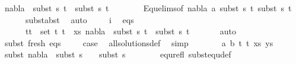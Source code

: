 \begin{isabellebody}
\ {\isachardoublequoteopen}nabla{}\ {\isasymturnstile}\ subst\ s{}\ t{}\ {\isasymapprox}\ subst\ s{}\ t{}{\isachardoublequoteclose}\ \isanewline
\ \ \ \ \ \isamarkupfalse%
\ Equ{\isacharunderscore}{\kern0pt}elims{\isacharparenleft}{\kern0pt}{}{\isacharparenright}{\kern0pt}{\isacharbrackleft}{\kern0pt}of\ nabla{}\ a\ {\isacartoucheopen}subst\ s{}\ t{}{\isacartoucheclose}\ {\isacartoucheopen}subst\ s{}\ t{}{\isacartoucheclose}{\isacharbrackright}{\kern0pt}\ \isanewline
\ \ \ \ \ \ subst{\isacharunderscore}{\kern0pt}abst\ \isamarkupfalse%
\ auto\isanewline
\ \ \ \isamarkupfalse%
\ i\ \isamarkupfalse%
\ eqs{\isacharcolon}{\kern0pt}\ \isanewline
\ \ \ \ \ {\isachardoublequoteopen}{\isasymforall}\ {\isacharparenleft}{\kern0pt}t{}{\isacharcomma}{\kern0pt}t{}{\isacharparenright}{\kern0pt}\ {\isasymin}\ set\ {\isacharparenleft}{\kern0pt}{\isacharparenleft}{\kern0pt}t{}{\isacharcomma}{\kern0pt}\ t{}{\isacharparenright}{\kern0pt}\ {\isacharhash}{\kern0pt}\ xs{\isacharparenright}{\kern0pt}{\isachardot}{\kern0pt}\ nabla{}\ {\isasymturnstile}\ subst\ s{}\ t{}\ {\isasymapprox}\ subst\ s{}\ t{}{\isachardoublequoteclose}\isanewline
\ \ \ \ \ \isamarkupfalse%
\ auto\isanewline
\isanewline
\ \ \ \isamarkupfalse%
\ subst\ fresh\ eqs\isanewline
\ \ \ \isamarkupfalse%
\ {\isacharquery}{\kern0pt}case\ \isamarkupfalse%
\ all{\isacharunderscore}{\kern0pt}solutions{\isacharunderscore}{\kern0pt}def\ \isamarkupfalse%
\ simp\isanewline
\ \isamarkupfalse%
\isanewline
\ \ \ \isamarkupfalse%
\ {\isacharparenleft}{\kern0pt}{}\ a\ b\ t{}\ t{}\ xs\ ys{\isacharparenright}{\kern0pt}\isanewline
\ \ \ \isamarkupfalse%
\ \isamarkupfalse%
\ subst{\isacharcolon}{\kern0pt}\ {\isachardoublequoteopen}nabla{}\ {\isasymTurnstile}\ subst\ {\isacharparenleft}{\kern0pt}s{}\ {\isasymbullet}\ {\isacharbrackleft}{\kern0pt}{\isacharbrackright}{\kern0pt}{\isacharparenright}{\kern0pt}\ {\isasymapprox}\ subst\ s{}{\isachardoublequoteclose}\ \isanewline
\ \ \ \ \ \isamarkupfalse%
\ equ{\isacharunderscore}{\kern0pt}refl\ subst{\isacharunderscore}{\kern0pt}equ{\isacharunderscore}{\kern0pt}def\ \isamarkupfalse%

\end{isabellebody}
